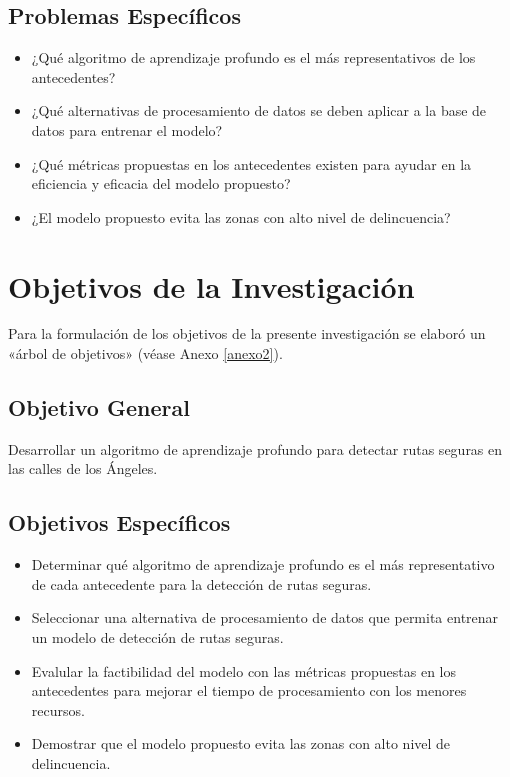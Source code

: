 \subsection{Problemas Espec\'{i}ficos}
\newcommand{\Pbone}{
¿Qué algoritmo de aprendizaje profundo es el más representativos de los antecedentes?
}
\newcommand{\Pbtwo}{
¿Qué alternativas de procesamiento de datos se deben aplicar a la base de datos para entrenar el modelo?
}
\newcommand{\Pbthree}{
¿Qué métricas propuestas en los antecedentes existen para ayudar en la eficiencia y eficacia del modelo propuesto?
}
\newcommand{\Pbfour}{
¿El modelo propuesto evita las zonas con alto nivel de delincuencia?
}

\begin{itemize}
	\item \Pbone
	\item \Pbtwo
	\item \Pbthree
	\item \Pbfour
\end{itemize}

\section{Objetivos de la Investigación}
Para la formulación de los objetivos de la presente investigación se elaboró un «árbol de objetivos» (véase Anexo \ref{anexo2}).
\subsection{Objetivo General}
\newcommand{\ObjetivoGeneral}{
Desarrollar un algoritmo de aprendizaje profundo para detectar rutas seguras en las calles de los Ángeles.
}
\ObjetivoGeneral
\subsection{Objetivos Espec\'{i}ficos}
\newcommand{\Objone}{
Determinar qué algoritmo de aprendizaje profundo es el más representativo de cada antecedente para la detección de rutas seguras.
}
\newcommand{\Objtwo}{
Seleccionar una alternativa de procesamiento de datos que permita entrenar un modelo de detección de rutas seguras.
}
\newcommand{\Objthree}{
Evalular la factibilidad del modelo con las métricas propuestas en los antecedentes para mejorar el tiempo de procesamiento con los menores recursos.
}
\newcommand{\Objfour}{
Demostrar que el modelo propuesto evita las zonas con alto nivel de delincuencia.
}

\begin{itemize}
	\item {\Objone}
	\item {\Objtwo}
	\item {\Objthree}
	\item {\Objfour}
\end{itemize}

